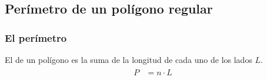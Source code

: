 \documentclass[14pt]{beamer}
\begin{document}
\subsection{Perímetro de un polígono regular}

\begin{frame}
\frametitle{El perímetro}
El  de un polígono es la suma de la longitud de cada uno de los lados $L$. %
\begin{eqnarray*}
\begin{aligned}
P &= n \cdot L
\end{aligned}
\end{eqnarray*}
\end{frame}
\end{document}
